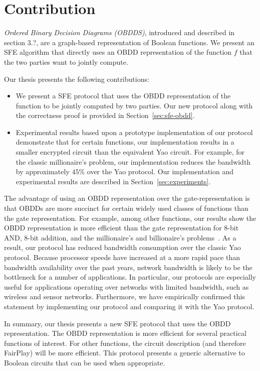 \section{Contribution}
\label{sec:obdd-intro}



{\it Ordered Binary Decision Diagrams (OBDDS)}, introduced and
described in section 3.?, are a graph-based representation of Boolean
functions.  We present an
SFE algorithm that directly uses an OBDD representation of the
function $f$ that the two parties want to jointly compute. 

Our thesis presents the following contributions:
\begin{itemize}
\item We present a SFE protocol that uses the OBDD representation of
the function to be jointly computed by two parties. Our new protocol along with the
correctness proof is provided in Section~\ref{sec:sfe-obdd}.

\item 
Experimental results based upon a prototype implementation of our
protocol demonstrate that for certain functions, our
implementation results in a smaller encrypted circuit than
the equivalent Yao circuit. For example, for the classic millionaire's problem, our
implementation reduces the bandwidth by approximately $45$\% over the Yao
protocol.  Our
implementation and experimental results are described in
Section~\ref{sec:experiments}.
\end{itemize}

The
advantage of using an OBDD representation over the gate-representation
is that OBDDs are more succinct for certain widely used classes of
functions than the gate representation. For example, among other
functions, our results show the OBDD representation is more efficient
than the gate representation for 8-bit AND, 8-bit addition, and the
millionaire's and billionaire's problems~\cite{Yao:86}.  As a result,
our protocol has reduced bandwidth consumption over the classic Yao
protocol.  Because processor speeds have
increased at a more rapid pace than bandwidth availability over the
past years, network bandwidth is likely to be the bottleneck for a number of applications. In particular, our
protocols are especially useful for applications operating over
networks with limited bandwidth, such as wireless and sensor networks.
Furthermore, we have empirically confirmed this statement by
implementing our protocol and comparing it with the Yao protocol.

In summary, our thesis presents a new SFE protocol that uses the OBDD representation.
The OBDD representation is more efficient for several practical functions of 
interest. For other functions, the circuit description (and therefore
FairPlay) will be more efficient. This protocol presents a generic alternative to 
Boolean circuits that can be used when appropriate. 



